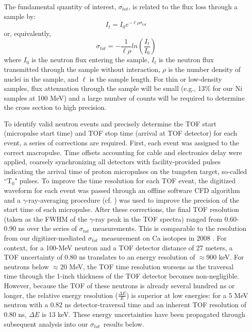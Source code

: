 \documentclass[twocolumn,secnumarabic,amssymb, nobibnotes, aps, prl,
superscriptaddress, nobalancelastpage]{revtex4}
\newcommand{\tot}{\ensuremath{\sigma_{tot}}}
\newcommand{\tZero}{T\ensuremath{_{0}}}
\begin{document}
The fundamental quantity of interest, \tot, is related to the flux
loss through a sample by:
\begin{equation}
I_{t} = I_{0}e^{-{\ell\rho\sigma_{tot}}}
\end{equation}
or, equivalently,
\begin{equation}
    \tot = -\frac{1}{\ell\rho}ln\left(\frac{I_{t}}{I_{0}}\right)
\end{equation}
where $I_{0}$ is the neutron flux entering the sample, $I_{t}$ is the neutron
flux transmitted through the sample without interaction, $\rho$ is the number
density of nuclei in the sample, and $\ell$ is the sample length. For thin
or low-density samples, flux attenuation through the sample will be small
(e.g., 13\% for our Ni samples at 100 MeV) and a large number
of counts will be required to determine the cross section to high
precision.

To identify valid neutron events and precisely determine the TOF start (micropulse start 
time) and TOF stop time (arrival at TOF detector) for each event, a series of corrections 
are required.  First, each event was assigned to the correct macropulse.
Time offsets accounting for cable and
electronics delay were applied, coarsely synchronizing all detectors with
facility-provided pulses indicating the arrival time of proton micropulses on the
tungsten target, so-called ``\tZero" pulses.
To improve the time resolution for each TOF
event, the digitized waveform for each event was passed 
through an offline software CFD algorithm and a $\gamma$-ray-averaging
procedure (cf. \cite{Shane2010}) was used to improve the precision of the start 
time of each micropulse.  After these corrections, the final TOF resolution
(taken as the FWHM of the $\gamma$-ray peak in the TOF spectra) ranged from
0.60-0.90 ns over the series of \tot\ measurements.
This is comparable to the resolution from 
our digitizer-mediated \tot\ measurement on Ca isotopes in 2008 \cite{Shane2010}.
For context, for a 100-MeV neutron and a TOF detector distance of 27 meters, a TOF 
uncertainty of 0.80 ns translates to an energy resolution of $\approx$900 keV.
For neutrons below $\approx$20 MeV, the TOF time resolution worsens as the traversal time 
through the 1-inch thickness of the TOF detector becomes non-negligible.
However, because the TOF of these neutrons is already several hundred ns or
longer, the relative energy resolution ($\frac{\Delta E}{E}$) is
superior at low energies: for a 5 MeV neutron with a 0.82 ns detector-traversal time and
an inherent TOF resolution of 0.80 ns, $\Delta E$ is 13 keV. These energy uncertainties
have been propagated through subsequent analysis into our \tot\ results below.
\end{document}
